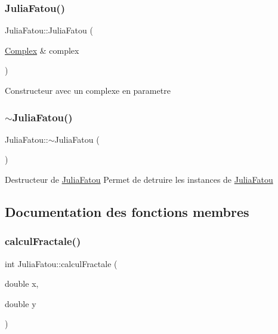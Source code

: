 \subsubsection{\texorpdfstring{Julia\+Fatou()}{JuliaFatou()}\hspace{0.1cm}{\footnotesize\ttfamily [3/3]}}
{\footnotesize\ttfamily Julia\+Fatou\+::\+Julia\+Fatou (\begin{DoxyParamCaption}\item[{\hyperlink{classComplex}{Complex} \&}]{complex }\end{DoxyParamCaption})}

Constructeur avec un complexe en parametre \mbox{\label{classJuliaFatou_a7220625bde7cd3720c7999f0f4cd6d65}} 
\subsubsection{\texorpdfstring{$\sim$\+Julia\+Fatou()}{~JuliaFatou()}}
{\footnotesize\ttfamily Julia\+Fatou\+::$\sim$\+Julia\+Fatou (\begin{DoxyParamCaption}{ }\end{DoxyParamCaption})}

Destructeur de \hyperlink{classJuliaFatou}{Julia\+Fatou} Permet de detruire les instances de \hyperlink{classJuliaFatou}{Julia\+Fatou} 

\subsection{Documentation des fonctions membres}
\mbox{\label{classJuliaFatou_ac3fbb733a74a780dfc096df4ca64da69}} 
\subsubsection{\texorpdfstring{calcul\+Fractale()}{calculFractale()}}
{\footnotesize\ttfamily int Julia\+Fatou\+::calcul\+Fractale (\begin{DoxyParamCaption}\item[{double}]{x,  }\item[{double}]{y }\end{DoxyParamCaption})\hspace{0.3cm}{\ttfamily [virtual]}}

